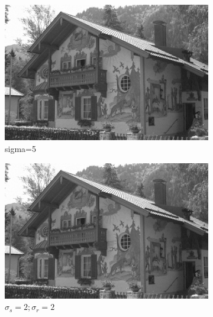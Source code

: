 \documentclass[12pt]{article}
\begin{document}
\begin{figure}[h]
    \centering
    \begin{subfigure}[b]{0.24\textwidth}
        \centering
        \includegraphics[width=\textwidth]{../images/noisy_kodak24.png}
        \caption{sigma=5}
        \label{Noisy (sigma=5)}
    \end{subfigure}
    \begin{subfigure}[b]{0.24\textwidth}
        \centering
        \includegraphics[width=\textwidth]{../images/filtered_kodak24_bilateral_sigma_s_2_sigma_r_2.png}
        \caption{$\sigma_s=2;\sigma_r=2$}
        \label{fig:subfig2}
    \end{subfigure}
    \begin{subfigure}[b]{0.24\textwidth}
        \centering

\end{subfigure}
\end{figure}
\end{document}
